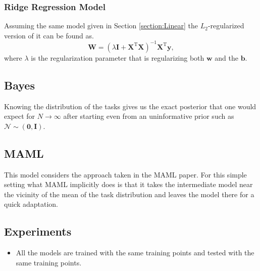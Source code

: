 \subsubsection{Ridge Regression Model}
Assuming the same model given in Section \ref{section:Linear} the $L_2$-regularized version of it can be found as. 
\begin{equation}
  \mathbf{W}=(\lambda\mathbf{I}+\mathbf{X}^{\text{T}}\mathbf{X})^{-1}\mathbf{X}^{\text{T}}\mathbf{y},
\end{equation}
where $\lambda$ is the regularization parameter that is regularizing both $\mathbf{w}$ and the $\mathbf{b}$.

\subsection{Bayes}
Knowing the distribution of the tasks gives us the exact posterior that one would expect for $N\to\infty$ after starting even from an uninformative prior such as $\mathcal{N}\sim(\mathbf{0}, \mathbf{I})$.

\subsection{MAML}
This model considers the approach taken in the MAML paper. For this simple setting what MAML implicitly does is that it takes the intermediate model near the vicinity of the mean of the task distribution and leaves the model there for a quick adaptation.
\subsection*{Experiments}
\begin{itemize}
  \item All the models are trained with the same training points and tested with the same training points.
\end{itemize}
